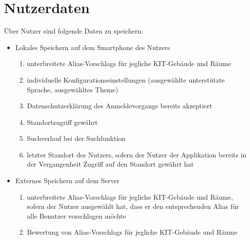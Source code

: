 \section{Nutzerdaten}

Über Nutzer sind folgende Daten zu speichern:
\begin{itemize}
	\item Lokales Speichern auf dem Smartphone des Nutzers
	\begin{enumerate}[label=\textbf{/D\arabic*0/}, align=left]
		\item unterbreitete \Glspl{Alias-Vorschlag} für jegliche \Gls{KIT}-Gebäude und Räume
		\item individuelle Konfigurationseinstellungen (ausgewählte unterstützte Sprache, ausgewähltes \Gls{Theme})
		\item Datenschutzerklärung des Anmeldevorgangs bereits akzeptiert
		\item Standortzugriff gewährt
		\item Suchverlauf bei der Suchfunktion
		\item letzter Standort des Nutzers, sofern der Nutzer der Applikation bereits in der Vergangenheit Zugriff auf den Standort gewährt hat
	\end{enumerate}
	\item Externes Speichern auf dem Server
	\begin{enumerate}[label=\textbf{/D\arabic*0/}, align=left, resume]
		\item unterbreitete \Glspl{Alias-Vorschlag} für jegliche \Gls{KIT}-Gebäude und Räume, sofern der Nutzer ausgewählt hat, dass er den entsprechenden \Gls{Alias} für alle Benutzer vorschlagen möchte
		\item Bewertung von \Glspl{Alias-Vorschlag} für jegliche \Gls{KIT}-Gebäude und Räume
		\setcounter{user_data_end}{\value{enumi}}
	\end{enumerate}
\end{itemize}